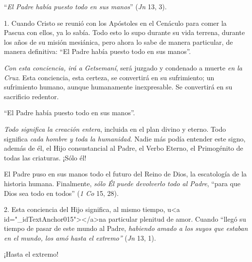 			\begin{body} “\textit{El Padre había puesto todo en sus manos}” (\textit{Jn} 13, 3).\end{body}
			
			\begin{body}1. Cuando Cristo se reunió con los Apóstoles en el Cenáculo para comer la Pascua con ellos, ya lo sabía. Todo esto lo supo durante su vida terrena, durante los años de su misión mesiánica, pero ahora lo sabe de manera particular, de manera definitiva: “El Padre había puesto todo en sus manos”. \end{body}
			
			\begin{body}\textit{Con esta conciencia, irá a Getsemaní}, será juzgado y condenado a muerte \textit{en la Cruz}. Esta conciencia, esta certeza, se convertirá en su sufrimiento; un sufrimiento humano, aunque humanamente inexpresable. Se convertirá en su sacrificio redentor. \end{body}
			
			\begin{body}“El Padre había puesto todo en sus manos”. \end{body}
			
			\begin{body}\textit{Todo significa la creación entera}, incluida en el plan divino y eterno. Todo significa \textit{cada hombre y toda la humanidad}. Nadie más podía entender este signo, además de él, el Hijo consustancial al Padre, el Verbo Eterno, el Primogénito de todas las criaturas. ¡Sólo él! \end{body}
			
			\begin{body}El Padre puso en sus manos todo el futuro del Reino de Dios, la escatología de la historia humana. Finalmente, \textit{sólo Él puede devolverlo todo al Padre}, “para que Dios sea todo en todos” (\textit{1 Co }15, 28). \end{body}
			
			\begin{body}2. Esta conciencia del Hijo significa, al mismo tiempo, u<a id="_idTextAnchor015"></a>na particular plenitud de amor. Cuando “llegó su tiempo de pasar de este mundo al Padre, \textit{habiendo amado a los suyos que estaban en el mundo, los amó hasta el extremo”} (\textit{Jn} 13, 1). \end{body}
			
			\begin{body}¡Hasta el extremo! \end{body}
			

